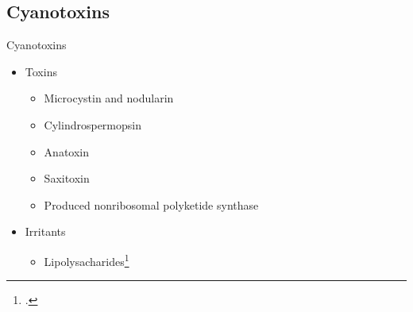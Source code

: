 \subsection{Cyanotoxins}
\begin{frame}{Cyanotoxins}

	\begin{itemize}
		\item Toxins
			\begin{itemize} 
				\item Microcystin and nodularin %
  				\item Cylindrospermopsin 
				\item Anatoxin 
				\item Saxitoxin 
				\item Produced nonribosomal polyketide synthase
			\end{itemize}
		\item Irritants
			\begin{itemize}
				\item Lipolysacharides\footcite{moore_richard_cyanobacterial_1993}
			\end{itemize}

	\end{itemize}

\end{frame}

